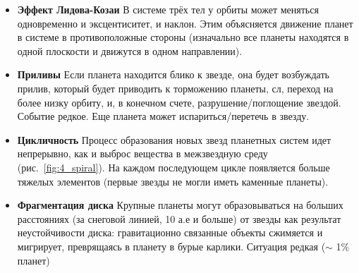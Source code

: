 \begin{itemize}

    \item \textbf{Эффект Лидова-Козаи} В системе трёх тел у орбиты может меняться одновременно и эксцентиситет, и наклон. Этим объясняется движение планет в системе в противоположные стороны (изначально все планеты находятся в одной плоскости и движутся в одном направлении).  
    \item \textbf{Приливы} Если планета находится блико к звезде, она будет возбуждать прилив, который будет приводить к торможению планеты, сл, переход на более низку орбиту, и, в конечном счете, разрушение/поглощение звездой. Событие редкое. Еще планета может испариться/перетечь в звезду.

    \item \textbf{Цикличность} Процесс образования новых звезд планетных систем идет непрерывно, как и выброс вещества в межзвездную среду (\mbox{рис. \ref{fig:4_spiral}}). На каждом последующем цикле появляется больше тяжелых элементов (первые звезды не могли иметь каменные планеты).
    
    \item \textbf{Фрагментация диска} Крупные планеты могут образовываться на больших расстояниях (за снеговой линией, 10 а.е и больше) от звезды как результат неустойчивости диска: гравитационно связанные объекты сжимяется и мигрирует, преврящаясь в планету в бурые карлики. Ситуация редкая ($\sim$ 1$\%$ планет)
    
\end{itemize}
